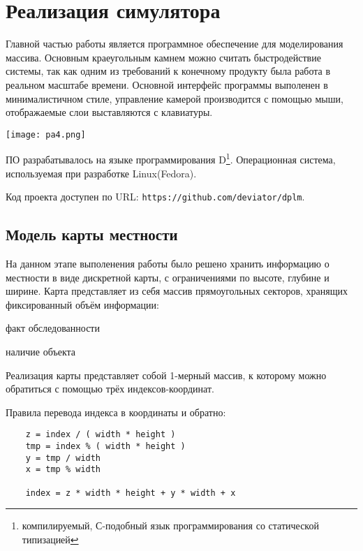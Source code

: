 \newpage
\section{Реализация симулятора}

Главной частью работы является программное обеспечение для моделирования
массива. Основным краеугольным камнем можно считать быстродействие системы, 
так как одним из требований к конечному продукту была работа в реальном масштабе
времени. Основной интерфейс программы выполенен в минималистичном стиле, управление
камерой производится с помощью мыши, отображаемые слои выставляются с клавиатуры.

\vspace{1em}

\texttt{[image: pa4.png]}

ПО разрабатывалось на языке программирования D\footnote{компилируемый, С-подобный
язык программирования со статической типизацией}. Операционная система, используемая
при разработке Linux(Fedora).

Код проекта доступен по URL: \verb|https://github.com/deviator/dplm|.

\newpage
\subsection{Модель карты местности}

На данном этапе выполенения работы было решено хранить информацию о местности в
виде дискретной карты, с ограничениями по высоте, глубине и ширине. Карта
представляет из себя массив прямоугольных секторов, хранящих фиксированный объём
информации:
\begin{mintemize}
    \item факт обследованности
    \item наличие объекта
\end{mintemize}

Реализация карты представляет собой 1-мерный массив, к которому можно обратиться с помощью трёх
индексов-координат.

Правила перевода индекса в координаты и обратно:

\begin{verbatim}
    z = index / ( width * height )
    tmp = index % ( width * height )
    y = tmp / width
    x = tmp % width

    index = z * width * height + y * width + x
\end{verbatim}
\vspace{-0.5em}

